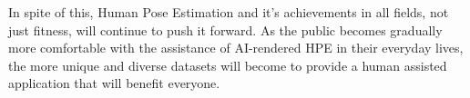 \documentclass[12pt]{extarticle}
\begin{document}
In spite of this, Human Pose Estimation and it’s achievements in all fields, not
just fitness, will continue to push it forward. As the public becomes gradually
more comfortable with the assistance of AI-rendered HPE in their everyday lives,
the more unique and diverse datasets will become to provide a human assisted
application that will benefit everyone.




\end{document}
